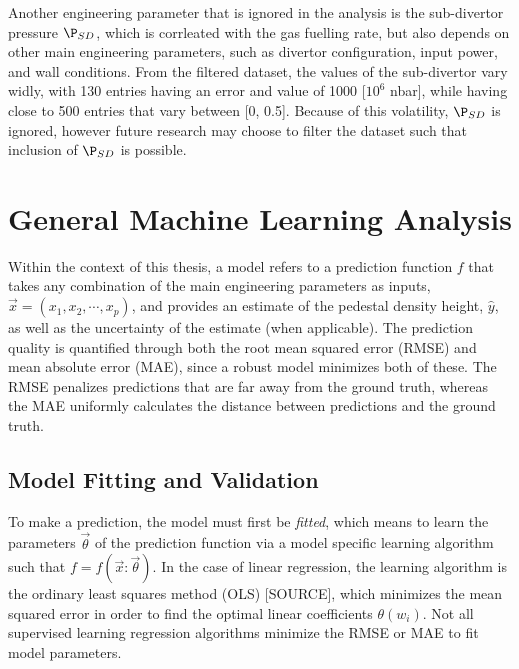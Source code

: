 \documentclass[a4paper, twoside, final, 12pt]{article}
\begin{document}
Another engineering parameter that is ignored in the analysis is the sub-divertor pressure $\P_{SD}$, which is corrleated with the gas fuelling rate, but also depends on other main engineering parameters, such as divertor configuration, input power, and wall conditions.
From the filtered dataset, the values of the sub-divertor vary widly, with 130 entries having an error and value of 1000 [$10^6$ nbar], while having close to 500 entries that vary between [0, 0.5].
Because of this volatility, $\P_{SD}$ is ignored, however future research may choose to filter the dataset such that inclusion of $\P_{SD}$ is possible.



\section{General Machine Learning Analysis}\label{sec:principle-machine-learning-analysis}
Within the context of this thesis, a model refers to a prediction function $f$ that takes any combination of the main engineering parameters as inputs, $\vec{x} = (x_1, x_2, \cdots, x_p)$,  and provides an estimate of the pedestal density height, $\hat{y}$, as well as the uncertainty of the estimate (when applicable).
The prediction quality is quantified through both the root mean squared error (RMSE) and mean absolute error (MAE), since a robust model minimizes both of these.
The RMSE penalizes predictions that are far away from the ground truth, whereas the MAE uniformly calculates the distance between predictions and the ground truth.

\subsection{Model Fitting and Validation}
To make a prediction, the model must first be \textit{fitted}, which means to learn the parameters $\vec{\theta}$ of the prediction function via a model specific learning algorithm such that $f = f(\vec{x}: \vec{\theta})$.
In the case of linear regression, the learning algorithm is the ordinary least squares method (OLS) [SOURCE], which minimizes the mean squared error in order to find the optimal linear coefficients $\theta(w_i)$.
Not all supervised learning regression algorithms minimize the RMSE or MAE to fit model parameters. 
\end{document}
